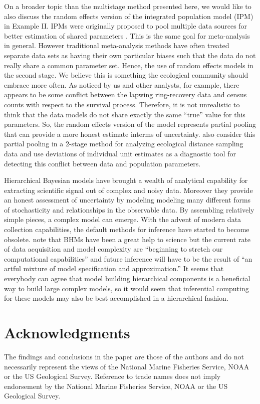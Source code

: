\documentclass[12pt]{article}
\begin{document}
On a broader topic than the multistage method presented here, we would like to also discuss the random effects version of the integrated population model (IPM) in Example II. IPMs were originally proposed to pool 
multiple data sources for better estimation of shared parameters \citep{schaub2011integrated}. This is the same goal for meta-analysis in general. However traditional meta-analysis methods have often treated separate data sets as having their own particular biases such that the data do not really share a common parameter set. Hence, the use of random effects models in the second stage. We believe this is something the ecological community should embrace more often. As noticed by us and other analysts, for example, there appears to be some conflict between the lapwing ring-recovery data and census counts with respect to the survival process. Therefore, it is not unrealistic to think that the data models do not share exactly the same ``true'' value for this parameters. So, the random effects version of the model represents partial pooling that can provide a more honest estimate interms of uncertainty. \cite{bravington2018reliable} also consider this partial pooling in a 2-stage method for analyzing ecological distance sampling data and use deviations of individual unit estimates as a diagnostic tool for detecting this conflict between data and population parameters. 

Hierarchical Bayesian models have brought a wealth of analytical capability for extracting scientific signal out of complex and noisy data. Moreover they provide an honest assessment of uncertainty by modeling modeling many different forms of stochasticity and relationships in the observable data. By assembling relatively simple pieces, a complex model can emerge. With the advent of modern data collection capabilities, the default methods for inference have started to become obsolete. \citet{gelfand2015hierarchical} note that BHMs have been a great help to science but the current rate of data acquisition and model complexity are ``beginning to stretch our computational capabilities'' and future inference will have to be the result of ``an artful mixture of model specification and approximation.'' It seems that everybody can agree that model building hierarchical components is a beneficial way to build large complex models, so it would seem that inferential computing for these models may also be best accomplished in a hierarchical fashion. 




\section*{Acknowledgments}
The findings and conclusions in the paper are those of the authors and do not necessarily represent the views of the National Marine Fisheries Service, NOAA or the US Geological Survey. Reference to trade names does not imply endorsement by the National Marine Fisheries Service, NOAA or the US Geological Survey.
\end{document}
